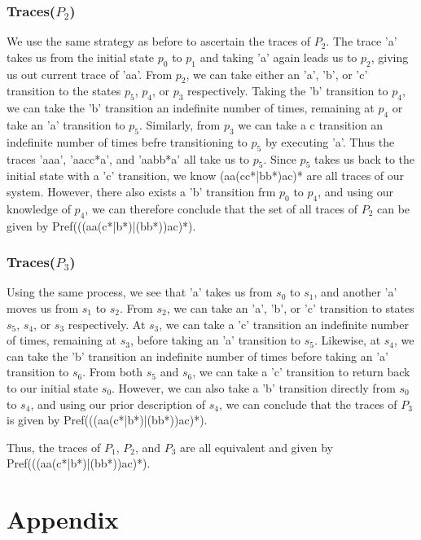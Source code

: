 \documentclass{article}[8pt]
\renewcommand{\thesubsubsection}{\thesection.\alph{subsection}.\Roman{subsubsection}}
\begin{document}
\subsubsection[~\thesubsubsection]{Traces($P_2$)}
We use the same strategy as before to ascertain the traces of $P_2$. The trace 'a' takes us from the initial state $p_0$ to $p_1$ and taking 'a' again leads us to $p_2$, giving us out current trace of 'aa'. From $p_2$, we can take either an 'a', 'b', or 'c' transition to the states $p_5$, $p_4$, or $p_3$ respectively. Taking the 'b' transition to $p_4$, we can take the 'b' transition an indefinite number of times, remaining at $p_4$ or take an 'a' transition to $p_5$. Similarly, from $p_3$ we can take a c transition an indefinite number of times befre transitioning to $p_5$ by executing 'a'. Thus the traces 'aaa', 'aacc*a', and 'aabb*a' all take us to $p_5$. Since $p_5$ takes us back to the initial state with a 'c' transition, we know (aa(cc*|bb*)ac)* are all traces of our system. However, there also exists a 'b' transition frm $p_0$ to $p_4$, and using our knowledge of $p_4$, we can therefore conclude that the set of all traces of $P_2$ can be given by Pref(((aa(c*|b*)|(bb*))ac)*).

\subsubsection[~\thesubsubsection]{Traces($P_3$)}
Using the same process, we see that 'a' takes us from $s_0$ to $s_1$, and another 'a' moves us from $s_1$ to $s_2$. From $s_2$, we can take an 'a', 'b', or 'c' transition to states $s_5$, $s_4$, or $s_3$ respectively. At $s_3$, we can take a 'c' transition an indefinite number of times, remaining at $s_3$, before taking an 'a' transition to $s_5$. Likewise, at $s_4$, we can take the 'b' transition an indefinite number of times before taking an 'a' transition to $s_6$. From both $s_5$ and $s_6$, we can take a 'c' transition to return back to our initial state $s_0$. However, we can also take a 'b' transition directly from $s_0$ to $s_4$, and using our prior description of $s_4$, we can conclude that the traces of $P_3$ is given by Pref(((aa(c*|b*)|(bb*))ac)*).

Thus, the traces of $P_1$, $P_2$, and $P_3$ are all equivalent and given by Pref(((aa(c*|b*)|(bb*))ac)*).

\section{Appendix}
\end{document}
